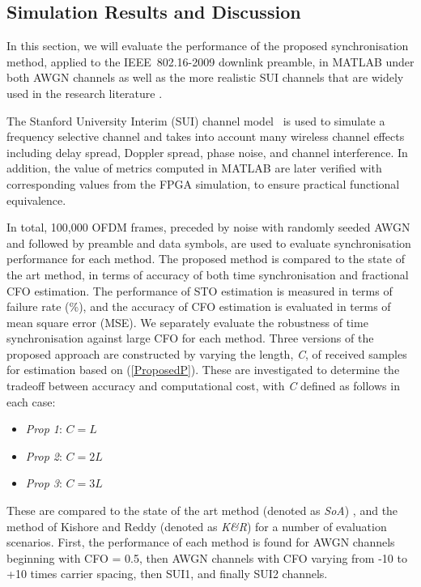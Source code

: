 \subsection{Simulation Results and Discussion}
In this section, we will evaluate the performance of the proposed synchronisation method, applied to the IEEE~802.16-2009 downlink preamble, in MATLAB under both AWGN channels as well as the more realistic SUI channels that are widely used in the research literature \cite{Kishore2006,Kim2008}.

The Stanford University Interim (SUI) channel model~\cite{V.ErcegJuly2003} is used to simulate a frequency selective channel and takes into account  many wireless channel effects including delay spread, Doppler spread, phase noise, and channel interference.
In addition, the value of metrics computed in MATLAB are later verified with corresponding values from the FPGA simulation, to ensure practical functional equivalence.

In total, 100,000 OFDM frames, preceded by noise with randomly seeded AWGN and followed by preamble and data symbols, are used to evaluate synchronisation performance for each method.
The proposed method is compared to the state of the art method, in terms of accuracy of both time synchronisation and fractional CFO estimation.
The performance of STO estimation is measured in terms of failure rate (\%), and the accuracy of CFO estimation is evaluated in terms of mean square error (MSE).
We separately evaluate the robustness of time synchronisation against large CFO for each method.
Three versions of the proposed approach are constructed by varying the length, \emph{C}, of received samples for estimation based on (\ref{ProposedP}). These are investigated to determine the tradeoff between accuracy and computational cost, with \emph{C} defined as follows in each case:
\begin{itemize}
\item \textit{Prop 1}: $C=L$
\item \textit{Prop 2}: $C=2L$
\item \textit{Prop 3}: $C=3L$
\end{itemize}
These are compared to the state of the art method (denoted as \textit{SoA}) \cite{Liu2009,Recio2010}, and the method of Kishore and Reddy \cite{Kishore2006} (denoted as \textit{K\&R}) for a number of evaluation scenarios.
First, the performance of each method is found for AWGN channels beginning with CFO = 0.5, then AWGN channels with CFO varying from -10 to +10 times carrier spacing, then SUI1, and finally SUI2 channels.

